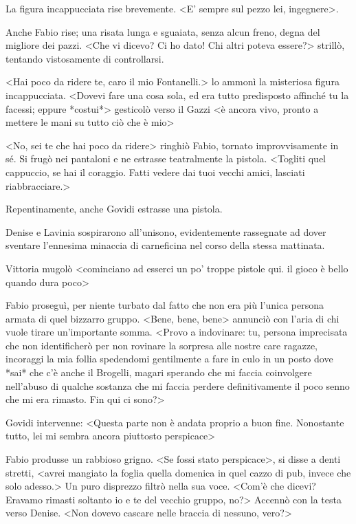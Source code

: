 La figura incappucciata rise brevemente. <E' sempre sul pezzo lei, ingegnere>.

Anche Fabio rise; una risata lunga e sguaiata, senza alcun freno, degna del migliore dei pazzi. <Che vi dicevo? Ci ho dato! Chi altri poteva essere?> strillò, tentando vistosamente di controllarsi.

<Hai poco da ridere te, caro il mio Fontanelli.> lo ammonì la misteriosa figura incappucciata. <Dovevi fare una cosa sola, ed era tutto predisposto affinché tu la facessi; eppure *costui*> gesticolò verso il Gazzi <è ancora vivo, pronto a mettere le mani su tutto ciò che è mio>

<No, sei te che hai poco da ridere> ringhiò Fabio, tornato improvvisamente in sé. Si frugò nei pantaloni e ne estrasse teatralmente la pistola. <Togliti quel cappuccio, se hai il coraggio. Fatti vedere dai tuoi vecchi amici, lasciati riabbracciare.>

Repentinamente, anche Govidi estrasse una pistola.

Denise e Lavinia sospirarono all'unisono, evidentemente rassegnate ad dover sventare l'ennesima minaccia di carneficina nel corso della stessa mattinata. 

Vittoria mugolò <cominciano ad esserci un po' troppe pistole qui. il gioco è bello quando dura poco>

Fabio proseguì, per niente turbato dal fatto che non era più l'unica persona armata di quel bizzarro gruppo. <Bene, bene, bene> annunciò con l'aria di chi vuole tirare un'importante somma. <Provo a indovinare: tu, persona imprecisata che non identificherò per non rovinare la sorpresa alle nostre care ragazze, incoraggi la mia follia spedendomi gentilmente a fare in culo in un posto dove *sai* che c'è anche il Brogelli, magari sperando che mi faccia coinvolgere nell'abuso di qualche sostanza che mi faccia perdere definitivamente il poco senno che mi era rimasto. Fin qui ci sono?>

Govidi intervenne: <Questa parte non è andata proprio a buon fine. Nonostante tutto, lei mi sembra ancora piuttosto perspicace>

Fabio produsse un rabbioso grigno. <Se fossi stato perspicace>, si disse a denti stretti, <avrei mangiato la foglia quella domenica in quel cazzo di pub, invece che solo adesso.> Un puro disprezzo filtrò nella sua voce. <Com'è che dicevi? Eravamo rimasti soltanto io e te del vecchio gruppo, no?> Accennò con la testa verso Denise. <Non dovevo cascare nelle braccia di nessuno, vero?>

